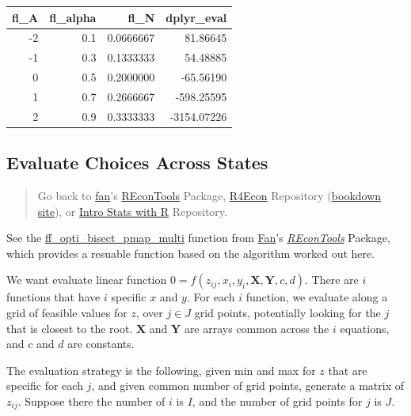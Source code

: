 \documentclass[
]{book}
\begin{document}
\begin{table}[!h]
\centering
\begin{tabular}{r|r|r|r}
\hline
fl\_A & fl\_alpha & fl\_N & dplyr\_eval\\
\hline
\rowcolor{gray!6}  -2 & 0.1 & 0.0666667 & 81.86645\\
\hline
-1 & 0.3 & 0.1333333 & 54.48885\\
\hline
\rowcolor{gray!6}  0 & 0.5 & 0.2000000 & -65.56190\\
\hline
1 & 0.7 & 0.2666667 & -598.25595\\
\hline
\rowcolor{gray!6}  2 & 0.9 & 0.3333333 & -3154.07226\\
\hline
\end{tabular}
\end{table}

\hypertarget{evaluate-choices-across-states}{%
\subsection{Evaluate Choices Across States}\label{evaluate-choices-across-states}}

\begin{quote}
Go back to \href{http://fanwangecon.github.io/}{fan}'s \href{https://fanwangecon.github.io/REconTools/}{REconTools} Package, \href{https://fanwangecon.github.io/R4Econ/}{R4Econ} Repository (\href{https://fanwangecon.github.io/R4Econ/bookdown}{bookdown site}), or \href{https://fanwangecon.github.io/Stat4Econ/}{Intro Stats with R} Repository.
\end{quote}

See the \href{https://fanwangecon.github.io/REconTools/reference/ff_opti_bisect_pmap_multi.html}{ff\_opti\_bisect\_pmap\_multi} function from \href{https://fanwangecon.github.io/}{Fan}'s \emph{\href{https://fanwangecon.github.io/REconTools/}{REconTools}} Package, which provides a resuable function based on the algorithm worked out here.

We want evaluate linear function \(0=f(z_{ij}, x_i, y_i, \textbf{X}, \textbf{Y}, c, d)\). There are \(i\) functions that have \(i\) specific \(x\) and \(y\). For each \(i\) function, we evaluate along a grid of feasible values for \(z\), over \(j\in J\) grid points, potentially looking for the \(j\) that is closest to the root. \(\textbf{X}\) and \(\textbf{Y}\) are arrays common across the \(i\) equations, and \(c\) and \(d\) are constants.

The evaluation strategy is the following, given min and max for \(z\) that are specific for each \(j\), and given common number of grid points, generate a matrix of \(z_{ij}\). Suppose there the number of \(i\) is \(I\), and the number of grid points for \(j\) is \(J\).
\end{document}
